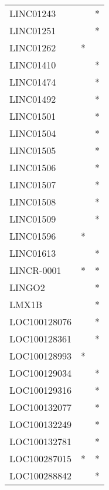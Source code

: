 \begin{longtable}{lcc}
LINC01243             &                &          * \\
LINC01251             &                &          * \\
LINC01262             &              * &            \\
LINC01410             &                &          * \\
LINC01474             &                &          * \\
LINC01492             &                &          * \\
LINC01501             &                &          * \\
LINC01504             &                &          * \\
LINC01505             &                &          * \\
LINC01506             &                &          * \\
LINC01507             &                &          * \\
LINC01508             &                &          * \\
LINC01509             &                &          * \\
LINC01596             &              * &            \\
LINC01613             &                &          * \\
LINCR-0001            &              * &          * \\
LINGO2                &                &          * \\
LMX1B                 &                &          * \\
LOC100128076          &                &          * \\
LOC100128361          &                &          * \\
LOC100128993          &              * &            \\
LOC100129034          &                &          * \\
LOC100129316          &                &          * \\
LOC100132077          &                &          * \\
LOC100132249          &                &          * \\
LOC100132781          &                &          * \\
LOC100287015          &              * &          * \\
LOC100288842          &                &          * \\

\end{longtable}

